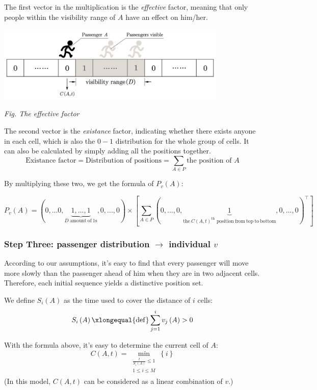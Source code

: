 \documentclass{article}
\begin{document}
	The first vector in the multiplication is the \textit{effective} factor, meaning that only people within the visibility range of \(A\) have an effect on him/her.

	\begin{center}
	\includegraphics[width = 11cm]{effective factor.jpg}

	\small\textit{Fig. The effective factor}
	\end{center}

	The second vector is the \textit{existance} factor, indicating whether there exists anyone in each cell, which is also the \(0-1\) distribution for the whole group of cells. It can also be calculated by simply adding all the positions together.
	\[\text{Existance factor} = \text{Distribution of positions} = \sum\limits_{A\in P} \text{the position of }A\]

	By multiplying these two, we get the formula of \(P_v\left( A \right)\):

	$$P_v\left( A \right) =\left( 0,...0,\underset{D\:\mathrm{amount}\:\mathrm{of}\:1\mathrm{s}}{\underbrace{1,...,1}},0,...,0 \right) \times \left[ \sum_{A\in P}{\left( 0,...,0,\underset{\mathrm{the}\:C\left( A,t \right) ^{\mathrm{th}}\,\,\mathrm{position}\:\mathrm{from}\:\mathrm{top}\:\mathrm{to}\:\mathrm{bottom}}{\underbrace{1}},0,...,0 \right) ^{\top}} \right] $$
	\subsubsection{Step Three: passenger distribution \(\to \) individual \(v\)}
	According to our assumptions, it's easy to find that every passenger will move more slowly than the passenger ahead of him when they are in two adjacent cells. Therefore, each initial sequence yields a distinctive position set.

	We define \(S_i\left( A \right)\) as the time used to cover the distance of \(i\) cells:
	$$S_i\left( A \right) \xlongequal{\mathrm{def}}\sum_{j=1}^i{v_j\left( A \right)}>0$$

	With the formula above, it's easy to determine the current cell of \(A\):
	$$C\left( A,t \right) =\min_{\substack{\frac{t}{S_i\left( A \right)}\le 1\\1\le i\le M\\}} \left\{ i \right\} $$
	(In this model, $C(A,t)$ can be considered as a linear combination of $v$.)
\end{document}
